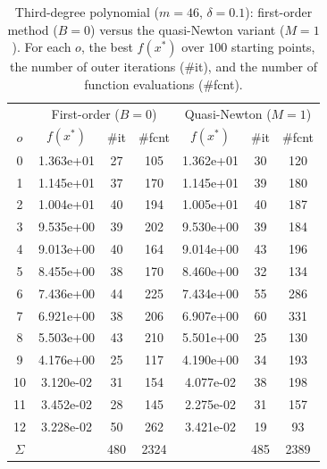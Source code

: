 \documentclass[11pt]{article}
\begin{document}
\begin{table}[ht!]
\centering

\label{tab:poly}
\begin{tabular}{c ccc ccc}
\hline
 & \multicolumn{3}{c}{First-order ($B=0$)} & \multicolumn{3}{c}{Quasi-Newton ($M=1$)} \\
$o$ & $f(x^*)$ & \#it & \#fcnt & $f(x^*)$ & \#it & \#fcnt \\
\hline
0  & 1.363e+01 & 27 & 105 & 1.362e+01 & 30 & 120 \\
1  & 1.145e+01 & 37 & 170 & 1.145e+01 & 39 & 180 \\
2  & 1.004e+01 & 40 & 194 & 1.005e+01 & 40 & 187 \\
3  & 9.535e+00 & 39 & 202 & 9.530e+00 & 39 & 184 \\
4  & 9.013e+00 & 40 & 164 & 9.014e+00 & 43 & 196 \\
5  & 8.455e+00 & 38 & 170 & 8.460e+00 & 32 & 134 \\
6  & 7.436e+00 & 44 & 225 & 7.434e+00 & 55 & 286 \\
7  & 6.921e+00 & 38 & 206 & 6.907e+00 & 60 & 331 \\
8  & 5.503e+00 & 43 & 210 & 5.501e+00 & 25 & 130 \\
9  & 4.176e+00 & 25 & 117 & 4.190e+00 & 34 & 193 \\
10 & 3.120e-02 & 31 & 154 & 4.077e-02 & 38 & 198 \\
11 & 3.452e-02 & 28 & 145 & 2.275e-02 & 31 & 157 \\
12 & 3.228e-02 & 50 & 262 & 3.421e-02 & 19 & 93  \\
\hline
$\Sigma$ & & 480 & 2324 & & 485 & 2389 \\
\hline
\end{tabular}
\caption{Third-degree polynomial ($m=46$, $\delta=0.1$): first-order method
($B=0$) versus the quasi-Newton variant ($M=1$). For each $o$, the best
$f(x^*)$ over $100$ starting points, the number of outer iterations (\#it), and
the number of function evaluations (\#fcnt).}
\end{table}
\end{document}
